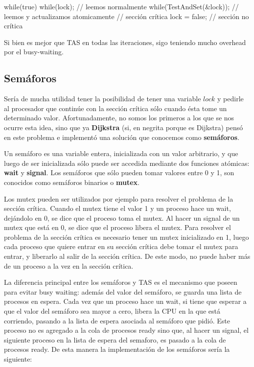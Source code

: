 \documentclass{article}
\begin{document}
\begin{code}
while(true)
{
    while(lock);                // leemos normalmente
    while(TestAndSet(&lock));   // leemos y actualizamos atomicamente
		// sección crítica
		lock = false;
		// sección no crítica
}
\end{code}

Si bien es mejor que TAS en todas las iteraciones, sigo teniendo mucho overhead por el busy-waiting.

\subsection{Sem\'aforos}

Ser\'ia de mucha utilidad tener la posibilidad de tener una variable $lock$ y pedirle al procesador que contin\'ue con la secci\'on cr\'itica s\'olo cuando \'esta tome un determinado valor. Afortunadamente, no somos los primeros a los que se nos ocurre esta idea, sino que ya \textbf{Dijkstra} (si, en negrita porque es Dijkstra) pens\'o en este problema e implement\'o una soluci\'on que conocemos como \textbf{sem\'aforos}.

Un sem\'aforo es una variable entera, inicializada con un valor arbitrario, y que luego de ser inicializada s\'olo puede ser accedida mediante dos funciones atómicas: \textbf{wait} y \textbf{signal}. Los semáforos que s\'olo pueden tomar valores entre 0 y 1, son conocidos como sem\'aforos binarios o \textbf{mutex}.

Los mutex pueden ser utilizados por ejemplo para resolver el problema de la secci\'on cr\'itica. Cuando el mutex tiene el valor 1 y un proceso hace un wait, dej\'andolo en 0, se dice que el proceso toma el mutex. Al hacer un signal de un mutex que est\'a en 0, se dice que el proceso libera el mutex. Para resolver el problema de la secci\'on cr\'itica es necesario tener un mutex inicializado en 1, luego cada proceso que quiere entrar en su secci\'on cr\'itica debe tomar el mutex para entrar, y liberarlo al salir de la secci\'on cr\'itica. De este modo, no puede haber m\'as de un proceso a la vez en la secci\'on cr\'itica.

La diferencia principal entre los semáforos y TAS es el mecanismo que poseen para evitar busy waiting: adem\'as del valor del sem\'aforo, se guarda una lista de procesos en espera. Cada vez que un proceso hace un wait, si tiene que esperar a que el valor del sem\'aforo sea mayor a cero, libera la CPU en la que est\'a corriendo, pasando a la lista de espera asociada al sem\'aforo que pidi\'o. Este proceso no es agregado a la cola de procesos ready sino que, al hacer un signal, el siguiente proceso en la lista de espera del semaforo, es pasado a la cola de procesos ready. De esta manera la implementaci\'on de los sem\'aforos ser\'ia la siguiente:
\end{document}
